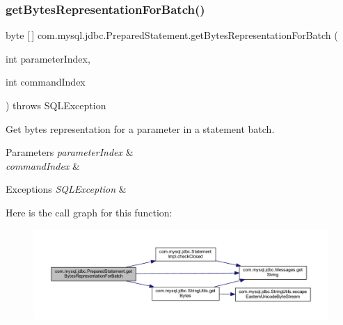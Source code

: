 \subsubsection{\texorpdfstring{get\+Bytes\+Representation\+For\+Batch()}{getBytesRepresentationForBatch()}}
{\footnotesize\ttfamily byte \mbox{[}$\,$\mbox{]} com.\+mysql.\+jdbc.\+Prepared\+Statement.\+get\+Bytes\+Representation\+For\+Batch (\begin{DoxyParamCaption}\item[{int}]{parameter\+Index,  }\item[{int}]{command\+Index }\end{DoxyParamCaption}) throws S\+Q\+L\+Exception\hspace{0.3cm}{\ttfamily [protected]}}

Get bytes representation for a parameter in a statement batch.


\begin{DoxyParams}{Parameters}
{\em parameter\+Index} & \\
\hline
{\em command\+Index} & \\
\hline
\end{DoxyParams}

\begin{DoxyExceptions}{Exceptions}
{\em S\+Q\+L\+Exception} & \\
\hline
\end{DoxyExceptions}
Here is the call graph for this function\+:
\nopagebreak
\begin{figure}[H]
\begin{center}
\leavevmode
\includegraphics[width=350pt]{classcom_1_1mysql_1_1jdbc_1_1_prepared_statement_a7fd98fc094ff75e0c2cacedb818f236e_cgraph}
\end{center}
\end{figure}
\mbox{\label{classcom_1_1mysql_1_1jdbc_1_1_prepared_statement_a3f7dd0edd868d1c66f08be25392fba8e}} 
